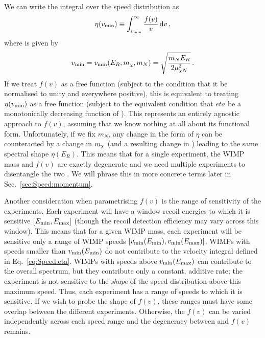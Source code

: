 We can write the integral over the speed distribution as 
\begin{equation}
\label{eq:Speed:eta}
\eta(\vmin) \equiv \int_{\vmin}^\infty \frac{f(v)}{v}\,\mathrm{d}v\,, 
\end{equation}
where \vmin is given by
\begin{equation}
v_\textrm{min} = v_\textrm{min}(E_R, \mchi, m_N) = \sqrt{\frac{m_N E_R}{2 \mu_{\chi N}^2}}\,.
\end{equation}
If we treat $f(v)$ as a free function (subject to the condition that it be normalised to unity and everywhere positive), this is equivalent to treating $\eta(\vmin)$ as a free function (subject to the equivalent condition that $eta$ be a monotonically decreasing function of \vmin). This represents an entirely agnostic approach to $f(v)$, assuming that we know nothing at all about its functional form. Unfortunately, if we fix $m_N$, any change in the form of $\eta$ can be counteracted by a change in $\mchi$ (and a resulting change in \vmin) leading to the same spectral shape $\eta(E_R)$. This means that for a single experiment, the WIMP mass and $f(v)$ are exactly degenerate and we need multiple experiments to disentangle the two \cite{Drees:2008}. We will phrase this in more concrete terms later in Sec.~\ref{sec:Speed:momentum}.

Another consideration when parametrising $f(v)$ is the range of sensitivity of the experiments. Each experiment will have a window recoil energies to which it is sensitive $\left[\Emin, \Emax\right]$ (though the recoil detection efficiency may vary across this window). This means that for a given WIMP mass, each experiment will be sensitive only a range of WIMP speeds $\left[\vmin(\Emin), \vmin(\Emax)\right]$. WIMPs with speeds smaller than $\vmin(\Emin)$ do not contribute to the velocity integral defined in Eq.~\ref{eq:Speed:eta}. WIMPs with speeds above $\vmin(\Emax)$ can contribute to the overall spectrum, but they contribute only a constant, additive rate; the experiment is not sensitive to the \textit{shape} of the speed distribution above this maximum speed. Thus, each experiment has a range of speeds to which it is sensitive. If we wish to probe the shape of $f(v)$, these ranges must have some overlap between the different experiments. Otherwise, the $f(v)$ can be varied independently across each speed range and the degeneracy between \mchi and $f(v)$ remains. 


